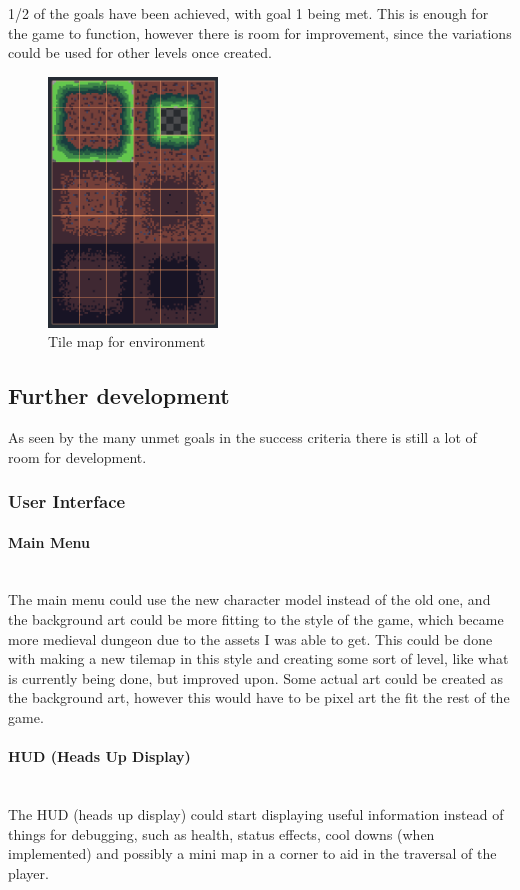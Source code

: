 \documentclass{article}
\newcommand{\parBr}{\vspace{5mm}}%
\newcommand{\myparagraph}[1]{\paragraph{#1}\mbox{}\\} %
\begin{document}
\parBr

1/2 of the goals have been achieved, with goal 1 being met. This is enough for the game to function, however there is room for improvement, since the variations could be used for other levels once created.

\begin{figure}[H]
\centering
\includegraphics[width = 0.4\textwidth]{tilemap}
\caption{Tile map for environment}
\label{tilemap_sprite}
\end{figure}

\subsection{Further development}
As seen by the many unmet goals in the success criteria there is still a lot of room for development.

\subsubsection{User Interface}

\myparagraph{Main Menu}
The main menu could use the new character model instead of the old one, and the background art could be more fitting to the style of the game, which became more medieval dungeon due to the assets I was able to get. This could be done with making a new tilemap in this style and creating some sort of level, like what is currently being done, but improved upon. Some actual art could be created as the background art, however this would have to be pixel art the fit the rest of the game.

\myparagraph{HUD (Heads Up Display)}
The HUD (heads up display) could start displaying useful information instead of things for debugging, such as health, status effects, cool downs (when implemented) and possibly a mini map in a corner to aid in the traversal of the player.
\end{document}
